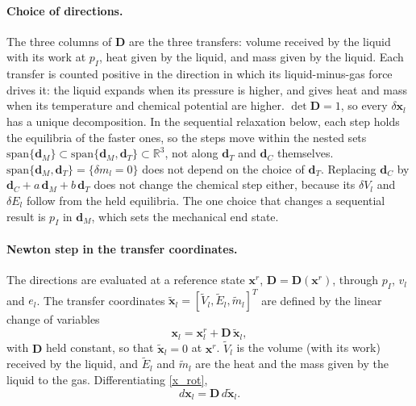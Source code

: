 \paragraph{Choice of directions.}
The three columns of $\boldsymbol{D}$ are the three transfers: volume received by the liquid with its work at $p_I$, heat given by the liquid, and mass given by the liquid. Each transfer is counted positive in the direction in which its liquid-minus-gas force drives it: the liquid expands when its pressure is higher, and gives heat and mass when its temperature and chemical potential are higher. $\det\boldsymbol{D}=1$, so every $\delta\boldsymbol{x}_l$ has a unique decomposition. In the sequential relaxation below, each step holds the equilibria of the faster ones, so the steps move within the nested sets $\mathrm{span}\{\boldsymbol{d}_M\}\subset\mathrm{span}\{\boldsymbol{d}_M,\boldsymbol{d}_T\}\subset\mathbb{R}^3$, not along $\boldsymbol{d}_T$ and $\boldsymbol{d}_C$ themselves. $\mathrm{span}\{\boldsymbol{d}_M,\boldsymbol{d}_T\}=\{\delta m_l=0\}$ does not depend on the choice of $\boldsymbol{d}_T$. Replacing $\boldsymbol{d}_C$ by $\boldsymbol{d}_C+a\,\boldsymbol{d}_M+b\,\boldsymbol{d}_T$ does not change the chemical step either, because its $\delta V_l$ and $\delta E_l$ follow from the held equilibria. The one choice that changes a sequential result is $p_I$ in $\boldsymbol{d}_M$, which sets the mechanical end state.

\paragraph{Newton step in the transfer coordinates.}
The directions are evaluated at a reference state $\boldsymbol{x}^r$, $\boldsymbol{D}=\boldsymbol{D}(\boldsymbol{x}^r)$, through $p_I$, $v_l$ and $e_l$. The transfer coordinates $\tilde{\boldsymbol{x}}_l=[\tilde{V}_l,\tilde{E}_l,\tilde{m}_l]^T$ are defined by the linear change of variables
\begin{equation}\label{x_rot}
\boldsymbol{x}_l=\boldsymbol{x}_l^r+\boldsymbol{D}\,\tilde{\boldsymbol{x}}_l,
\end{equation}
with $\boldsymbol{D}$ held constant, so that $\tilde{\boldsymbol{x}}_l=0$ at $\boldsymbol{x}^r$. $\tilde{V}_l$ is the volume (with its work) received by the liquid, and $\tilde{E}_l$ and $\tilde{m}_l$ are the heat and the mass given by the liquid to the gas. Differentiating \eqref{x_rot},
\begin{equation}\label{dx_rot}
d\boldsymbol{x}_l=\boldsymbol{D}\,d\tilde{\boldsymbol{x}}_l .
\end{equation}

